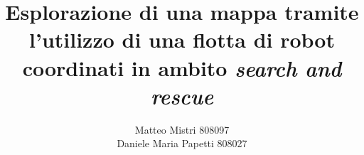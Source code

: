 \documentclass[a4paper,12pt]{report} %
\begin{document}
 

\title{Esplorazione di una mappa tramite l'utilizzo di una flotta di robot coordinati in ambito \textit{search and rescue}} 
\author{Matteo Mistri 808097\\ Daniele Maria Papetti 808027}

\maketitle
\tableofcontents








\end{document}
